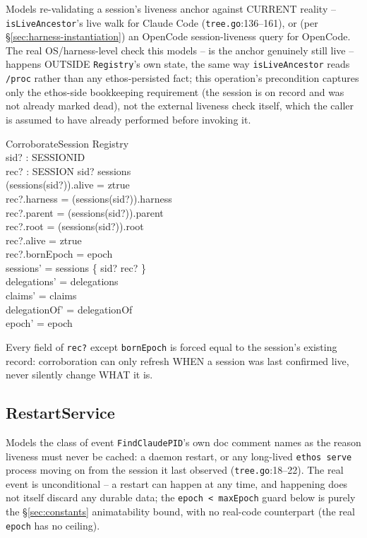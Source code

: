 \documentclass[a4paper,10pt,fleqn]{article}
\newcommand{\fpath}[1]{\texttt{#1}}
\newcommand{\field}[1]{\texttt{#1}}
\begin{document}
Models re-validating a session's liveness anchor against CURRENT
reality -- \field{isLiveAncestor}'s live walk for Claude Code
(\fpath{tree.go}:136--161), or (per
\S\ref{sec:harness-instantiation}) an OpenCode session-liveness query
for OpenCode. The real OS/harness-level check this models -- is the
anchor genuinely still live -- happens OUTSIDE \field{Registry}'s own
state, the same way \field{isLiveAncestor} reads \fpath{/proc} rather
than any ethos-persisted fact; this operation's precondition captures
only the ethos-side bookkeeping requirement (the session is on record
and was not already marked dead), not the external liveness check
itself, which the caller is assumed to have already performed before
invoking it.

\begin{schema}{CorroborateSession}
\Delta Registry \\
sid? : SESSIONID \\
rec? : SESSION
\where
sid? \in \dom sessions \\
(sessions(sid?)).alive = ztrue \\
rec?.harness = (sessions(sid?)).harness \\
rec?.parent = (sessions(sid?)).parent \\
rec?.root = (sessions(sid?)).root \\
rec?.alive = ztrue \\
rec?.bornEpoch = epoch \\
sessions' = sessions \oplus \{ sid? \mapsto rec? \} \\
delegations' = delegations \\
claims' = claims \\
delegationOf' = delegationOf \\
epoch' = epoch
\end{schema}

Every field of \field{rec?} except \field{bornEpoch} is forced equal to
the session's existing record: corroboration can only refresh WHEN a
session was last confirmed live, never silently change WHAT it is.

\subsection{RestartService}
\label{sec:oprestart}

Models the class of event \field{FindClaudePID}'s own doc comment names
as the reason liveness must never be cached: a daemon restart, or any
long-lived \field{ethos serve} process moving on from the session it
last observed (\fpath{tree.go}:18--22). The real event is unconditional
-- a restart can happen at any time, and happening does not itself
discard any durable data; the \field{epoch < maxEpoch} guard below is
purely the \S\ref{sec:constants} animatability bound, with no real-code
counterpart (the real \field{epoch} has no ceiling).
\end{document}
